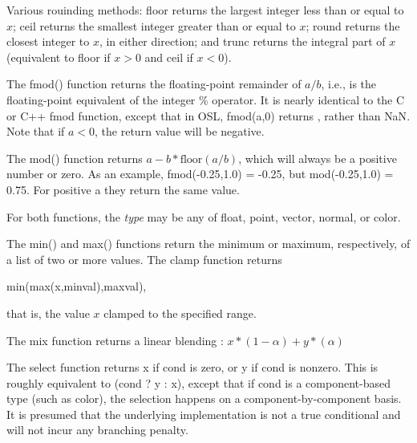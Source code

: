\documentclass[11pt,letterpaper]{book}
\def\color{{\cf color}\xspace}
\def\normal{{\cf normal}\xspace}
\def\point{{\cf point}\xspace}
\def\vector{{\cf vector}\xspace}
\begin{document}
Various rouinding methods: {\cf floor} returns the largest integer less
than or equal to $x$; {\cf ceil} returns the smallest integer greater than
or equal to $x$; {\cf round} returns the closest integer to $x$, in
either direction; and {\cf trunc} returns the integral part of $x$
(equivalent to {\cf floor} if $x>0$ and {\cf ceil} if $x<0$).
\apiend


The {\cf fmod()} function returns the floating-point remainder of $a/b$,
i.e., is the floating-point equivalent of the integer {\cf \%} operator.
It is nearly identical to the C or C++ {\cf fmod} function, except that
in OSL, {\cf fmod(a,0)} returns {}, rather than {\cf NaN}.  Note
that if $a < 0$, the return value will be negative.

The {\cf mod()} function returns $a - b*\mbox{floor}(a/b)$, which will
always be a positive number or zero.  
As an example, {\cf fmod(-0.25,1.0) = -0.25}, but {\cf mod(-0.25,1.0) =
  0.75}.  For positive {\cf a} they return the same value.

For both functions, the \emph{type} may be any of {\cf float}, \point,
\vector, \normal, or \color.
\apiend

  
The {\cf min()} and {\cf max()} functions return the minimum or maximum,
respectively, of a list of two or more values.  The {\cf clamp}
function returns

\hspace{2em} {\cf min(max(x,minval),maxval)},

\noindent that is, the value $x$ clamped to the specified range.
\apiend

The {\cf mix} function returns a linear blending :
$ x*(1-\alpha) + y*(\alpha) $
\apiend

The {\cf select} function returns {\cf x} if {\cf cond} is zero, or {\cf y}
if {\cf cond} is nonzero. This is roughly equivalent to {\cf (cond ? y : x)},
except that if {\cf cond} is a component-based type (such as {\cf color}),
the selection happens on a component-by-component basis. It is presumed
that the underlying implementation is not a true conditional and will not
incur any branching penalty.
\apiend
\end{document}

